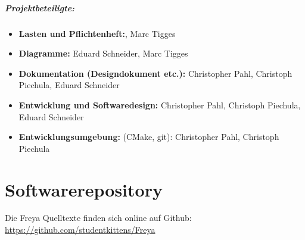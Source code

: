 \documentclass[11pt]{scrreprt}
\begin{document}
\paragraph{Projektbeteiligte:}
\begin{itemize}
    \item \textbf{Lasten und Pflichtenheft:}, Marc Tigges
    \item \textbf{Diagramme:} Eduard Schneider, Marc Tigges
    \item \textbf{Dokumentation (Designdokument etc.):} Christopher Pahl, Christoph Piechula, Eduard Schneider
    \item \textbf{Entwicklung und Softwaredesign:} Christopher Pahl, Christoph Piechula, Eduard Schneider
    \item \textbf{Entwicklungsumgebung:} (CMake, git): Christopher Pahl, Christoph Piechula 
\end{itemize}

\chapter{Softwarerepository}
Die Freya Quelltexte finden sich online auf Github:
\\
\url{https://github.com/studentkittens/Freya}
\end{document}
